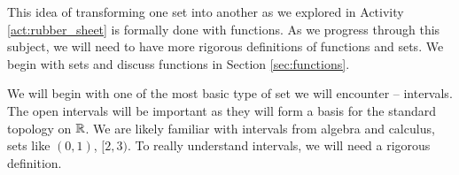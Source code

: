 \begin{comment}

\ActivitySolution
\ba
\item 
	\begin{enumerate}[i.]  
	\item We can take the unit circle and fix the points where the circle intersects the coordinate axes. Push the remaining points on the circle toward the square in a radial manner. This deforms the circle onto the square.
	\item In order to make the letter \texttt{S}, we would have to cut the circle. Since this is not allowed, we cannot deform the circle to the letter $\texttt{S}$.
	\item Think of the circle as being inscribed inside the star. Then push out the portions of the circle that are not on the star toward the arms. This deforms the circle onto the star.
	\item Consider the unit circle as our circle. Project the left half of the circle onto the $y$-axis. This deforms the circle onto the letter \texttt{D}.	
	\end{enumerate}

\item  Smash down the top half of the sphere onto the bottom half. This makes a bowl. To make a doughnut or a coffee mug with a handle, we would have to punch a hole in the sphere. So the sphere and the bowl can be deformed onto one another, but neither can be deformed into a doughnut or a coffee mug.  However, we can deform a coffee mug into a doughnut (see \url{https://en.wikipedia.org/wiki/File:Mug_and_Torus_morph.gif}) for an animation. The process involves molding the mug part around the handle until the result is a doughnut. This process can be reversed, so a coffee mug and a doughnut can be deformed into each other.  

\ea


\end{comment}

This idea of transforming one set into another as we explored in Activity \ref{act:rubber_sheet} is formally done with functions. As we progress through this subject, we will need to have more rigorous definitions of functions and sets. We begin with sets and discuss functions in Section \ref{sec:functions}. 

\label{sec_intervals}

We will begin with one of the most basic type of set we will encounter -- intervals. The open intervals will be important as they will form a basis for the standard topology on $\mathbb{R}$. We are likely familiar with intervals from algebra and calculus, sets like $(0,1)$, $[2,3)$. To really understand intervals, we will need a rigorous definition.


